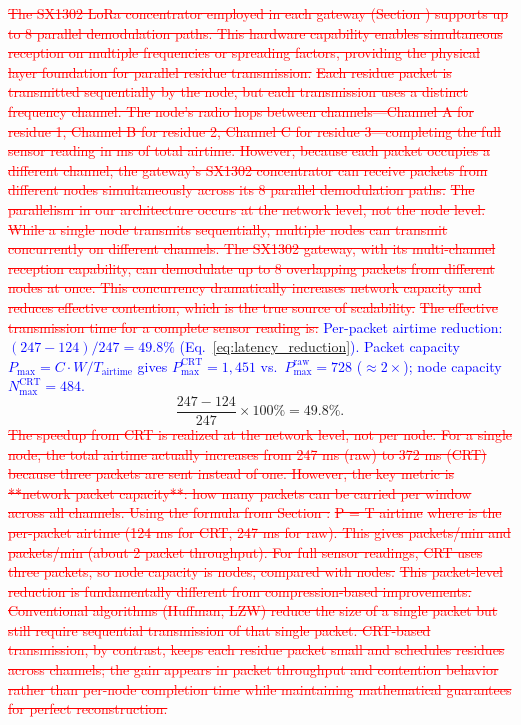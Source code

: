 \documentclass[pdflatex,sn-mathphys-num]{sn-jnl}
\theoremstyle{thmstyleone}
\theoremstyle{thmstyletwo}
\theoremstyle{thmstylethree}
\begin{document}
{\textcolor{red}{\sout{The SX1302 LoRa concentrator employed in each gateway (Section ) supports up to 8 parallel demodulation paths. This hardware capability enables simultaneous reception on multiple frequencies or spreading factors, providing the physical layer foundation for parallel residue transmission.}}
\textcolor{red}{\sout{Each residue packet is transmitted sequentially by the node, but each transmission uses a distinct frequency channel. The node's radio hops between channels—Channel A for residue 1, Channel B for residue 2, Channel C for residue 3—completing the full sensor reading in ms of total airtime. However, because each packet occupies a different channel, the gateway's SX1302 concentrator can receive packets from different nodes simultaneously across its 8 parallel demodulation paths.}}
\textcolor{red}{\sout{The parallelism in our architecture occurs at the network level, not the node level. While a single node transmits sequentially, multiple nodes can transmit concurrently on different channels. The SX1302 gateway, with its multi-channel reception capability, can demodulate up to 8 overlapping packets from different nodes at once. This concurrency dramatically increases network capacity and reduces effective contention, which is the true source of scalability.}}
\textcolor{red}{\sout{The effective transmission time for a complete sensor reading is:}}
\textcolor{blue}{Per-packet airtime reduction: $(247-124)/247=49.8\%$ (Eq.~\ref{eq:latency_reduction}). Packet capacity $P_{\max}=C\cdot W/T_{\text{airtime}}$ gives $P_{\max}^{\text{CRT}}=1{,}451$ vs.\ $P_{\max}^{\text{raw}}=728$ ($\approx2\times$); node capacity $N_{\max}^{\text{CRT}}=484$.}
\begin{equation}
\frac{247-124}{247}\times100\%=49.8\%.
\label{eq:latency_reduction}
\end{equation}
\textcolor{red}{\sout{The speedup from CRT is realized at the network level, not per node. For a single node, the total airtime actually increases from 247 ms (raw) to 372 ms (CRT) because three packets are sent instead of one. However, the key metric is **network packet capacity**: how many packets can be carried per window across all channels. Using the formula from Section :}}
\textcolor{red}{\sout{P = T airtime}}
\textcolor{red}{\sout{where is the per-packet airtime (124 ms for CRT, 247 ms for raw). This gives packets/min and packets/min (about 2 packet throughput). For full sensor readings, CRT uses three packets, so node capacity is nodes, compared with nodes.}}
\textcolor{red}{\sout{This packet-level reduction is fundamentally different from compression-based improvements. Conventional algorithms (Huffman, LZW) reduce the size of a single packet but still require sequential transmission of that single packet. CRT-based transmission, by contrast, keeps each residue packet small and schedules residues across channels; the gain appears in packet throughput and contention behavior rather than per-node completion time while maintaining mathematical guarantees for perfect reconstruction.}}
}
\end{document}
